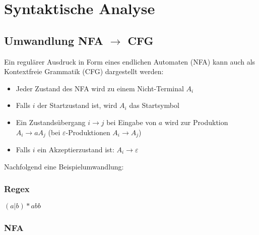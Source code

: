\section{Syntaktische Analyse}


\subsection{Umwandlung NFA $\rightarrow$ CFG}

Ein regulärer Ausdruck in Form eines endlichen Automaten (NFA) kann auch als Kontextfreie Grammatik
(CFG) dargestellt werden:

\begin{itemize}
	\item Jeder Zustand des NFA wird zu einem Nicht-Terminal $A_i$
	\item Falls $i$ der Startzustand ist, wird $A_i$ das Startsymbol
	\item Ein Zustandsübergang $i \rightarrow j$ bei Eingabe von $a$ wird zur Produktion $A_i
		\rightarrow aA_j$ (bei $\varepsilon$-Produktionen $A_i \rightarrow A_j$)
	\item Falls $i$ ein Akzeptierzustand ist: $A_i \rightarrow \varepsilon$
\end{itemize}

Nachfolgend eine Beispielumwandlung:

\subsubsection*{Regex}

$(a|b)*abb$

\subsubsection*{NFA}


